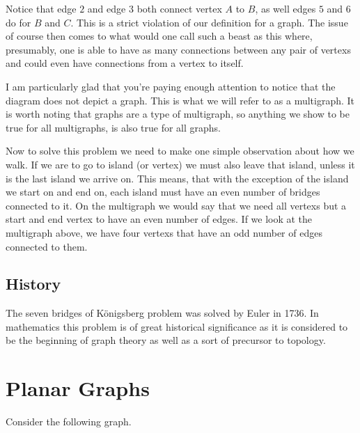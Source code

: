 \documentclass{article}
\begin{document}
Notice that \gls{edge} $2$ and \gls{edge} $3$ both connect \gls{vertex} $A$ to $B$, as well \glspl{edge} $5$ and $6$ do for $B$ and $C$. This is a strict violation of our definition for a \gls{graph}. The issue of course then comes to what would one call such a beast as this where, presumably, one is able to have as many connections between any pair of \glspl{vertex} and could even have connections from a \gls{vertex} to itself.

I am particularly glad that you're paying enough attention to notice that the diagram does not depict a \gls{graph}. This is what we will refer to as a \gls{multigraph}. It is worth noting that \glspl{graph} are a type of \gls{multigraph}, so anything we show to be true for all \glspl{multigraph}, is also true for all \glspl{graph}.

Now to solve this problem we need to make one simple observation about how we walk. If we are to go to island (or vertex) we must also leave that island, unless it is the last island we arrive on. This means, that with the exception of the island we start on and end on, each island must have an even number of bridges connected to it. On the \gls{multigraph} we would say that we need all \glspl{vertex} but a start and end \gls{vertex} to have an even number of edges. If we look at the \gls{multigraph} above, we have four \glspl{vertex} that have an odd number of \glspl{edge} connected to them.

\subsection{History}
The seven bridges of K\"onigsberg problem was solved by Euler %
in 1736. In mathematics this problem is of great historical significance as it is considered to be the beginning of graph theory as well as a sort of precursor to topology. %

\section{Planar Graphs}

Consider the following \gls{graph}.

\begin{center}
\end{center}
\end{document}
